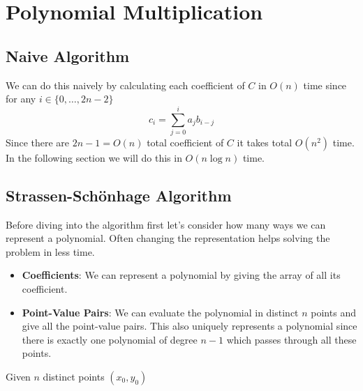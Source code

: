 \chapter{Polynomial Multiplication}
\begin{algoprob}
\end{algoprob}
\section{Naive Algorithm}
We can do this naively by calculating each coefficient of $C$ in $O(n)$ time since for any $i\in\{0,\dots, 2n-2\}$ $$c_i=\sum_{j=0}^ia_jb_{i-j}$$Since there are $2n-1=O(n)$ total coefficient of $C$ it takes total $O(n^2)$ time. In the following section we will do this in $O(n\log n)$ time.
\section{Strassen-Sch\"{o}nhage Algorithm}
Before diving into the algorithm first let's consider how many ways we can represent a polynomial. Often changing the representation helps solving the problem in less time.\begin{itemize}
	\item \textbf{Coefficients}: We can represent a polynomial by giving the array of all its coefficient.
	\item \textbf{Point-Value Pairs}: We can evaluate the polynomial in distinct $n$ points and give all the point-value pairs. This also uniquely represents a polynomial since there is exactly one polynomial of degree $n-1$ which passes through all these points. 
\end{itemize}
\begin{theorem}{}{}
	Given $n$ distinct points $(x_0,y_0)$
\end{theorem}
